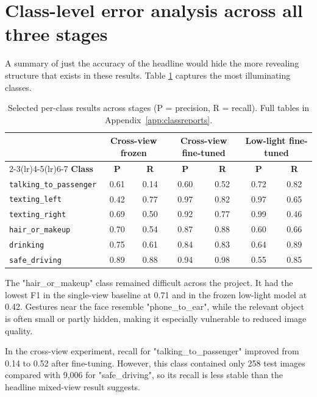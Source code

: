 \section{Class-level error analysis across all three stages}
\label{sec:qr-class-errors}

A summary of just the accuracy of the headline would hide the more revealing structure that exists in these results. Table \ref{tab:class-errors} captures the most illuminating classes.

\begin{table}[htbp]
\centering
\caption{Selected per-class results across stages (P = precision, R = recall). Full tables in Appendix~\ref{app:classreports}.}
\label{tab:class-errors}
\small
\begin{tabular}{lcccccc}
\toprule
& \multicolumn{2}{c}{\textbf{Cross-view frozen}} & \multicolumn{2}{c}{\textbf{Cross-view fine-tuned}} & \multicolumn{2}{c}{\textbf{Low-light fine-tuned}} \\
\cmidrule(lr){2-3}\cmidrule(lr){4-5}\cmidrule(lr){6-7}
\textbf{Class} & \textbf{P} & \textbf{R} & \textbf{P} & \textbf{R} & \textbf{P} & \textbf{R} \\
\midrule
\texttt{talking\_to\_passenger} & 0.61 & 0.14 & 0.60 & 0.52 & 0.72 & 0.82 \\
\texttt{texting\_left} & 0.42 & 0.77 & 0.97 & 0.82 & 0.97 & 0.65 \\
\texttt{texting\_right} & 0.69 & 0.50 & 0.92 & 0.77 & 0.99 & 0.46 \\
\texttt{hair\_or\_makeup} & 0.70 & 0.54 & 0.87 & 0.88 & 0.60 & 0.66 \\
\texttt{drinking} & 0.75 & 0.61 & 0.84 & 0.83 & 0.64 & 0.89 \\
\texttt{safe\_driving} & 0.89 & 0.88 & 0.94 & 0.98 & 0.55 & 0.85 \\
\bottomrule
\end{tabular}
\end{table}

The "hair\_or\_makeup" class remained difficult across the project. It had the lowest F1 in the single-view baseline at 0.71 and in the frozen low-light model at 0.42. Gestures near the face resemble "phone\_to\_ear", while the relevant object is often small or partly hidden, making it especially vulnerable to reduced image quality.

In the cross-view experiment, recall for "talking\_to\_passenger" improved from 0.14 to 0.52 after fine-tuning. However, this class contained only 258 test images compared with 9,006 for "safe\_driving", so its recall is less stable than the headline mixed-view result suggests.

